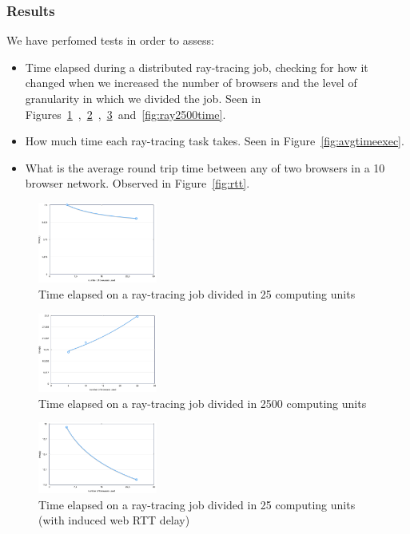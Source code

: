 \subsubsection{Results}

We have perfomed tests in order to assess:

\begin{itemize}
    \item Time elapsed during a distributed ray-tracing job, checking for how it changed when we increased the number of browsers and the level of granularity in which we divided the job. Seen in Figures~\ref{fig:ray25}~,~\ref{fig:ray2500}~,~\ref{fig:ray25time}~and~\ref{fig:ray2500time}.
    \item How much time each ray-tracing task takes. Seen in Figure~\ref{fig:avgtimeexec}.
    \item What is the average round trip time between any of two browsers in a 10 browser network. Observed in Figure~\ref{fig:rtt}.
\end{itemize}

\begin{figure}[h!]
  \centering
  \includegraphics[width=0.35\textwidth]{figs/2.png}
  \caption{Time elapsed on a ray-tracing job divided in 25 computing units}
  \label{fig:ray25}
\end{figure}

\begin{figure}[h!]
  \centering
  \includegraphics[width=0.35\textwidth]{figs/1.png}
  \caption{Time elapsed on a ray-tracing job divided in 2500 computing units}
  \label{fig:ray2500}
\end{figure}

\begin{figure}[h!]
  \centering
  \includegraphics[width=0.35\textwidth]{figs/4.png}
  \caption{Time elapsed on a ray-tracing job divided in 25 computing units (with induced web RTT delay)}
  \label{fig:ray25time}
\end{figure}


